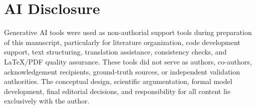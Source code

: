 \documentclass[12pt,a4paper]{article}
\begin{document}
\section*{AI Disclosure}

Generative AI tools were used as non-authorial support tools during preparation of this manuscript, particularly for literature organization, code development support, text structuring, translation assistance, consistency checks, and LaTeX/PDF quality assurance. These tools did not serve as authors, co-authors, acknowledgement recipients, ground-truth sources, or independent validation authorities. The conceptual design, scientific argumentation, formal model development, final editorial decisions, and responsibility for all content lie exclusively with the author.



\end{document}
